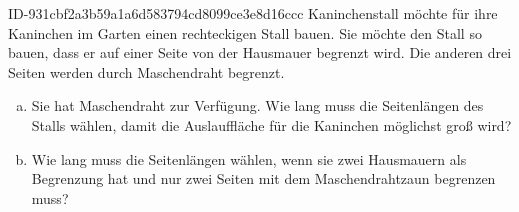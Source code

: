 \begin{exercise}
      {ID-931cbf2a3b59a1a6d583794cd8099ce3e8d16ccc}
      {Kaninchenstall}
  \ifproblem\problem
    \xxa{} möchte für ihre Kaninchen im Garten einen rechteckigen Stall
    bauen. Sie möchte den Stall so bauen, dass er auf einer Seite von der
    Hausmauer begrenzt wird. Die anderen drei Seiten werden durch Maschendraht
    begrenzt.
    \begin{enumerate}[a)]
      \item Sie hat  Maschendraht zur Verfügung. Wie lang muss
            \xxa{} die Seitenlängen des Stalls wählen, damit die Auslauffläche für
            die Kaninchen möglichst groß wird?
      \item Wie lang muss \xxa{} die Seitenlängen wählen, wenn sie zwei
            Hausmauern als Begrenzung hat und nur zwei Seiten mit dem
            Maschendrahtzaun begrenzen muss?
    \end{enumerate}
  \fi
\end{exercise}

